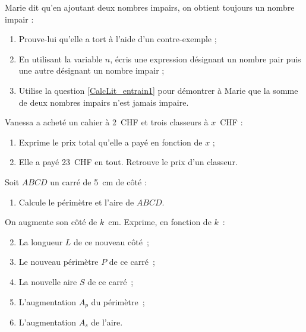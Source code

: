 \begin{exercice}
Marie dit qu'en ajoutant deux nombres impairs, on obtient toujours un nombre impair :
\begin{enumerate}
 \item Prouve-lui qu'elle a tort à l'aide d'un contre-exemple ;
 \item En utilisant la variable $n$, écris une expression désignant un nombre pair puis une autre désignant un nombre impair ; \label{CalcLit_entrain1}
 \item Utilise la question \ref{CalcLit_entrain1} pour démontrer à Marie que la somme de deux nombres impairs n'est jamais impaire.
 \end{enumerate}
\end{exercice}


\begin{exercice}
Vanessa a acheté un cahier à 2 CHF et trois classeurs à $x$ CHF :
\begin{enumerate}
 \item Exprime le prix total qu'elle a payé en fonction de $x$ ;
 \item Elle a payé 23 CHF en tout. Retrouve le prix d'un classeur.
 \end{enumerate}
\end{exercice}


\begin{exercice}
Soit $ABCD$ un carré de 5 cm de côté :
\begin{enumerate}
 \item Calcule le périmètre et l'aire de $ABCD$.
 \end{enumerate}
On augmente son côté de $k$ cm. Exprime, en fonction de $k$ :
\begin{enumerate}
\setcounter{enumi}{1}
 \item La longueur $L$ de ce nouveau côté ;
 \item Le nouveau périmètre $P$ de ce carré ;
 \item La nouvelle aire $S$ de ce carré ;
 \item L'augmentation $A_p$ du périmètre ;
 \item L'augmentation $A_s$ de l'aire.
 \end{enumerate}
\end{exercice}
